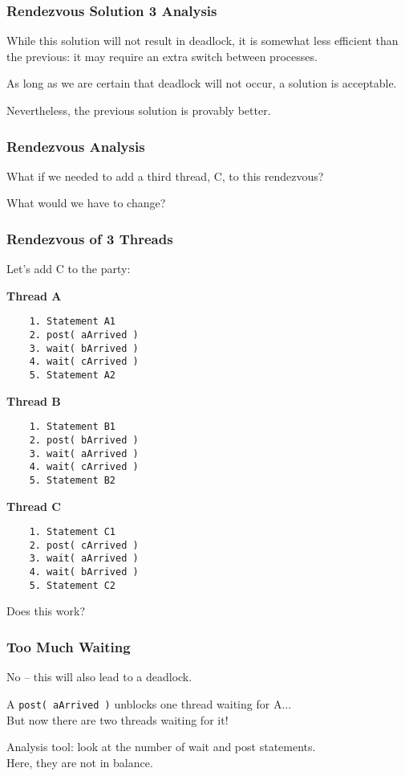 \begin{frame}
	\frametitle{Rendezvous Solution 3 Analysis}

	While this solution will not result in deadlock, it is somewhat less efficient than the previous: it may require an extra switch between processes.

	As long as we are certain that deadlock will not occur, a solution is acceptable.

	Nevertheless, the previous solution is provably better.

\end{frame}


\begin{frame}
	\frametitle{Rendezvous Analysis}

	What if we needed to add a third thread, C, to this rendezvous?

	What would we have to change?


\end{frame}

\begin{frame}[fragile]
	\frametitle{Rendezvous of 3 Threads}

	Let's add C to the party:

	\begin{multicols}{3}
		\textbf{Thread A}
		\begin{verbatim}
	1. Statement A1
	2. post( aArrived )
	3. wait( bArrived )
	4. wait( cArrived )
	5. Statement A2
  		\end{verbatim}
		\columnbreak
		\textbf{Thread B}
		\begin{verbatim}
	1. Statement B1
	2. post( bArrived )
	3. wait( aArrived )
	4. wait( cArrived )
	5. Statement B2
  		\end{verbatim}
  		\columnbreak
		\textbf{Thread C}\vspace{-2em}
		\begin{verbatim}
	1. Statement C1
	2. post( cArrived )
	3. wait( aArrived )
	4. wait( bArrived )
	5. Statement C2
  		\end{verbatim}
	\end{multicols}
	\vspace{-2em}

Does this work?

\end{frame}


\begin{frame}
\frametitle{Too Much Waiting}

No -- this will also lead to a deadlock. 

A \texttt{post( aArrived )} unblocks one thread waiting for A...\\
\quad But now there are two threads waiting for it!


Analysis tool: look at the number of wait and post statements.\\
\quad Here, they are not in balance.

\end{frame}


